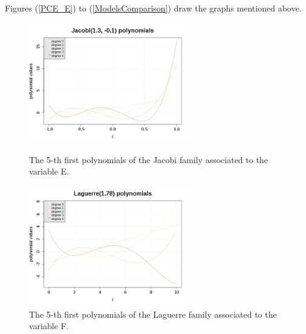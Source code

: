              Figures (\ref{PCE_E}) to (\ref{ModelsComparison}) draw the graphs mentioned above.




             \begin{figure}[H]
               \begin{minipage}{9cm}
                 \begin{center}
                   \includegraphics[width=7cm]{Figures/PCE_JacobiPolynomials_VariableE.png}
                   \caption{The 5-th first polynomials of the Jacobi family associated to the variable E.}
                   \label{PCE_E}
                 \end{center}
               \end{minipage}
               \hfill
               \begin{minipage}{9cm}
                 \begin{center}
                   \includegraphics[width=7cm]{Figures/PCE_LaguerrePolynomials_VariableF.png}
                   \caption{The 5-th first polynomials of the Laguerre family associated to the variable F.}
                   \label{PCE_F}
                 \end{center}
               \end{minipage}
             \end{figure}

